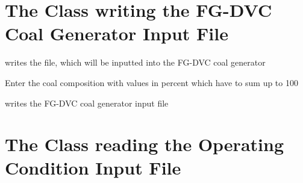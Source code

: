 \documentclass[letterpaper,10pt,english]{sphinxmanual}
\begin{document}
\section{The Class writing the FG-DVC Coal Generator Input File}
\label{InputOutputClasses:the-class-writing-the-fg-dvc-coal-generator-input-file}

\begin{fulllineitems}
\label{InputOutputClasses:InformationFiles.WriteFGDVCCoalFile}
writes the file, which will be inputted into the FG-DVC coal generator

\begin{fulllineitems}
\label{InputOutputClasses:InformationFiles.WriteFGDVCCoalFile.setCoalComp}
Enter the coal composition with values in percent which have to sum up to 100

\end{fulllineitems}


\begin{fulllineitems}
\label{InputOutputClasses:InformationFiles.WriteFGDVCCoalFile.write}
writes the FG-DVC coal generator input file

\end{fulllineitems}


\end{fulllineitems}



\section{The Class reading the Operating Condition Input File}
\label{InputOutputClasses:the-class-reading-the-operating-condition-input-file}
\end{document}
